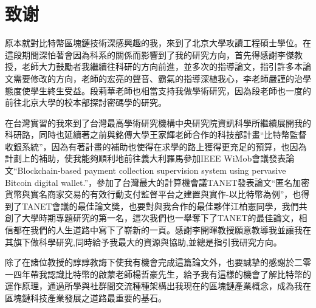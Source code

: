 
\chapter{致谢}
原本就對比特幣區塊鏈技術深感興趣的我，來到了北京大學攻讀工程碩士學位。在這段期間深怕著會因為科系的關係而影響到了我的研究方向，首先得感謝李傑教授，老師大力鼓勵者我繼續往科研的方向前進，並多次的指導論文，指引許多本論文需要修改的方向，老師的宏亮的聲音、霸氣的指導深植我心，李老師嚴謹的治學態度使學生終生受益。段莉華老師也相當支持我做學術研究，因為段老師也一度的前往北京大學的校本部探討密碼學的研究。

在台灣實習的我來到了台灣最高學術研究機構中央研究院資訊科學所繼續展開我的科研路，同時也延續著之前與銘傳大學王家輝老師合作的科技部計畫“比特幣監督收銀系統”，因為有著計畫的補助也使得在求學的路上獲得更充足的預算，也因為計劃上的補助，使我能夠順利地前往義大利羅馬參加IEEE WiMob會議發表論文“Blockchain-based payment collection supervision system using pervasive Bitcoin digital wallet.”\supercite{Blockchain-basedpaymentcollectionsupervisionsystemusingpervasiveBitcoindigitalwallet}，參加了台灣最大的計算機會議TANET發表論文“匿名加密貨幣與實名商家交易的有效行動支付監督平台之建置與實作-以比特幣為例”，也得到了TANET會議的最佳論文獎，也要對與我合作的最佳夥伴江柏憲同學，我們共創了大學時期專題研究的第一名，這次我們也一舉奪下了TANET的最佳論文，相信都在我們的人生道路中寫下了嶄新的一頁。感謝李開暉教授願意教導我並讓我在其旗下做科學研究,同時給予我最大的資源與協助,並總是指引我研究方向。

除了在諸位教授的諄諄教誨下使我有機會完成這篇論⽂外，也要誠摯的感謝於⼆零⼀四年帶我認識⽐特幣的啟蒙⽼師楊哲豪先⽣，給予我有這樣的機會了解⽐特幣的運作原理，通過所學與社群間交流種種架構出我現在的區塊鏈產業概念，成為我在區塊鏈科技產業發展之道路最重要的基⽯。
